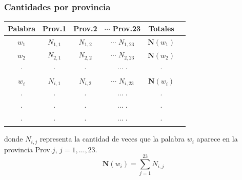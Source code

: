 \begin{frame}[c]\frametitle{Cantidades por provincia}
    \begin{table}[ht]
\centering
\begin{tabular}{|c|cccc|c|}
  \hline
Palabra &Prov.1& Prov.2 &$\cdots$ Prov.23& Totales \\
  \hline
  $w_1$& $N_{1,1}$& $N_{1,2}$ &$\cdots$
  $N_{1,23}$ & $\mathbf N(w_1)$\\
    $w_2$& $N_{2,1}$& $N_{2,2}$&$\cdots$
    $N_{2,23}$ & $\mathbf N(w_2)$\\
  $\cdot$& $\cdot$& $\cdot$ &$\cdots$
          $\cdot$ & $\cdot$\\$w_i$& $N_{i,1}$& $N_{i,2}$ &$\cdots$
      $N_{i,23}$ & $\mathbf N(w_i)$\\
    $\cdot$& $\cdot$& $\cdot$ &$\cdots$
          $\cdot$ & $\cdot$\\
            $\cdot$& $\cdot$& $\cdot$ &$\cdots$
                    $\cdot$ & $\cdot$\\  $\cdot$& $\cdot$& $\cdot$ &$\cdots$
                              $\cdot$ & $\cdot$\\
      \end{tabular}
\end{table}

\noindent donde $N_{i,j}$ representa la cantidad de veces que la palabra $w_i$ aparece en la provincia Prov.$j$, $j=1,\ldots, 23$. 
\begin{equation}
\mathbf N(w_i)=\sum_{j=1}^{23} N_{i,j}
\end{equation}


\end{frame}